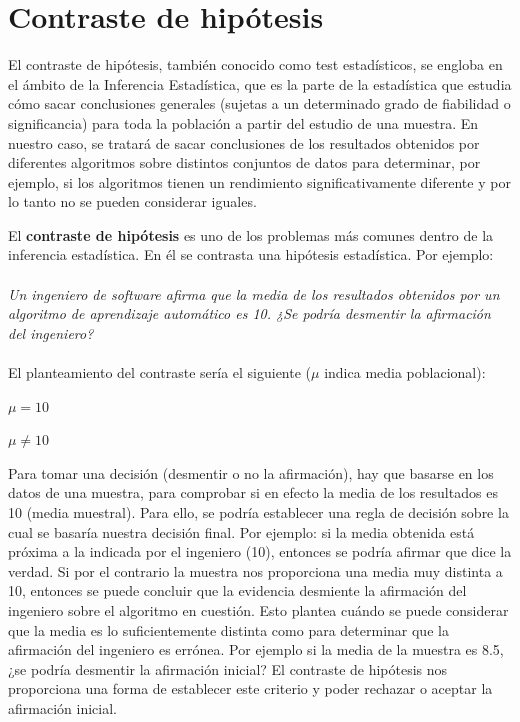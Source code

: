 
\chapter{Contraste de hipótesis} \label{contraste}
El contraste de hipótesis, también conocido como test estadísticos, se engloba en el ámbito de la
Inferencia Estadística, que es la parte de la estadística que estudia cómo sacar conclusiones generales
(sujetas a un determinado grado de fiabilidad o significancia) para toda la población a partir del
estudio de una muestra. En nuestro caso, se tratará de sacar conclusiones de los resultados obtenidos por
diferentes algoritmos sobre distintos conjuntos de datos para determinar, por ejemplo, si los algoritmos
tienen un rendimiento significativamente diferente y por lo tanto no se pueden considerar iguales.

El \textbf{contraste de hipótesis} es uno de los problemas más comunes dentro de la inferencia
estadística. En él se contrasta una hipótesis estadística. Por ejemplo:\\\\
\textit{Un ingeniero de software afirma que la media de los resultados obtenidos por un algoritmo
de aprendizaje automático es 10. ¿Se podría desmentir la afirmación del ingeniero?}\\\\
El planteamiento del contraste sería el siguiente  ($\mu$ indica media poblacional):
\begin{center}
$ \mu = 10 $

$ \mu \neq 10 $
\end{center}

Para tomar una decisión (desmentir o no la afirmación), hay que basarse en los datos de una muestra, para
comprobar si en efecto la media de los resultados es 10 (media muestral). Para ello, se podría establecer una
regla de decisión sobre la cual se basaría nuestra decisión final. Por ejemplo: si la media obtenida está
próxima a la indicada por el ingeniero (10), entonces se podría afirmar que dice la verdad. Si por el
contrario la muestra nos proporciona una media muy distinta a 10, entonces se puede concluir que la evidencia
desmiente la afirmación del ingeniero sobre el algoritmo en cuestión. Esto plantea cuándo  se puede considerar
que la media es lo suficientemente distinta como para determinar que la afirmación del ingeniero es errónea. Por
ejemplo si la media de la muestra es 8.5, ¿se podría desmentir la afirmación inicial? El contraste de hipótesis
nos proporciona una forma de establecer este criterio y poder rechazar o aceptar la afirmación inicial.

